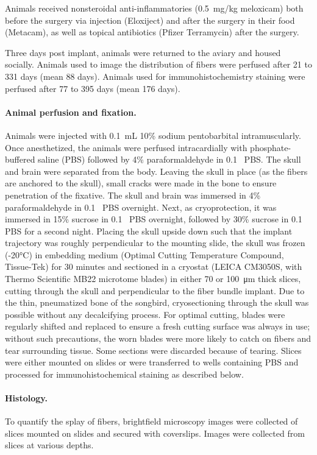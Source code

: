 Animals received nonsteroidal anti-inflammatories (0.5~mg/kg meloxicam) 
both before the surgery via injection (Eloxiject) and after the surgery 
in their food (Metacam), as well as topical antibiotics 
(Pfizer Terramycin) after the surgery.

Three days post implant, animals were returned to the aviary and housed 
socially. Animals used to image the distribution of fibers were perfused 
after 21 to 331 days (mean 88 days). Animals used for 
immunohistochemistry staining were perfused after 77 to 395 days 
(mean 176 days).

\paragraph{Animal perfusion and fixation.} Animals were injected 
with 0.1~\si{\milli\liter} 10\% 
sodium pentobarbital intramuscularly. Once anesthetized, the animals 
were perfused intracardially with phosphate-buffered saline (PBS) 
followed by 4\% paraformaldehyde in 0.1~\si{\Molar} PBS. The skull and brain 
were separated from the body. Leaving the skull in place (as the 
fibers are anchored to the skull), small cracks were made in the bone 
to ensure penetration of the fixative. The skull and brain was 
immersed in 4\% paraformaldehyde in 0.1~\si{\Molar} PBS overnight. Next, as 
cryoprotection, it was immersed in 15\% sucrose in 0.1~\si{\Molar} PBS overnight, 
followed by 30\% sucrose in 0.1~\si{\Molar} PBS for a second night. Placing the 
skull upside down such that the implant trajectory was roughly 
perpendicular to the mounting slide, the skull was frozen (-20\si{\celsius}) 
in embedding medium (Optimal Cutting Temperature Compound, Tissue-Tek) 
for 30 minutes and sectioned 
in a cryostat (LEICA CM3050S, with Thermo Scientific MB22 microtome 
blades) in either 70 or 100~\si{\micro\meter} thick slices, 
cutting through the skull and perpendicular to the fiber bundle implant. 
Due to the thin, pneumatized bone of the songbird, cryosectioning 
through the skull was possible without any decalcifying process. 
For optimal cutting, blades were regularly shifted and replaced 
to ensure a fresh cutting surface was always in use; without such 
precautions, the worn blades were more likely to catch on fibers 
and tear surrounding tissue. 
Some sections were discarded because of tearing. Slices were 
either mounted on slides or were transferred to wells 
containing PBS and processed for immunohistochemical staining 
as described below.

\paragraph{Histology.} To quantify the splay of fibers, brightfield 
microscopy images were collected of slices mounted on slides and 
secured with coverslips. Images were collected from slices at various 
depths.


